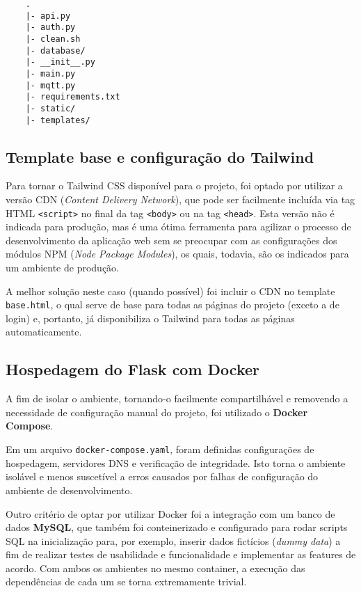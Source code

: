 \documentclass[11pt]{article}
\begin{document}
\begin{verbatim}
    .
    |- api.py
    |- auth.py
    |- clean.sh
    |- database/
    |- __init__.py
    |- main.py
    |- mqtt.py
    |- requirements.txt
    |- static/
    |- templates/

\end{verbatim}

\subsection{Template base e configuração do Tailwind}

Para tornar o Tailwind CSS disponível para o projeto, foi optado por utilizar a versão CDN (\textit{Content Delivery Network}), que pode ser facilmente incluída via tag HTML \texttt{<script>} no final da tag \texttt{<body>} ou na tag \texttt{<head>}. Esta versão não é indicada para produção, mas é uma ótima ferramenta para agilizar o processo de desenvolvimento da aplicação web sem se preocupar com as configurações dos módulos NPM (\textit{Node Package Modules}), os quais, todavia, são os indicados para um ambiente de produção.

A melhor solução neste caso (quando possível) foi incluir o CDN no template \texttt{base.html}, o qual serve de base para todas as páginas do projeto (exceto a de login) e, portanto, já disponibiliza o Tailwind para todas as páginas automaticamente.

\subsection{Hospedagem do Flask com Docker}

A fim de isolar o ambiente, tornando-o facilmente compartilhável e removendo a necessidade de configuração manual do projeto, foi utilizado o \textbf{Docker Compose}.

Em um arquivo \texttt{docker-compose.yaml}, foram definidas configurações de hospedagem, servidores DNS e verificação de integridade. Isto torna o ambiente isolável e menos suscetível a erros causados por falhas de configuração do ambiente de desenvolvimento.

Outro critério de optar por utilizar Docker foi a integração com um banco de dados \textbf{MySQL}, que também foi conteinerizado e configurado para rodar scripts SQL na inicialização para, por exemplo, inserir dados fictícios (\textit{dummy data}) a fim de realizar testes de usabilidade e funcionalidade e implementar as features de acordo. Com ambos os ambientes no mesmo container, a execução das dependências de cada um se torna extremamente trivial.
\end{document}
